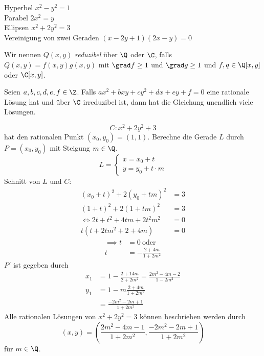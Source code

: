 \begin{exmp*}
	Hyperbel $x^2-y^2 = 1$\\
	Parabel $2x^2=y$\\
	Ellipsen $x^2+2y^2=3$\\
	Vereinigung von zwei Geraden $(x-2y+1)(2x-y)=0$
\end{exmp*}

Wir nennen $Q(x,y)$ \emph{reduzibel} über $\Q$ oder $\C$, falls $Q(x,y) = f(x,y)g(x,y)$ mit $\grad f \geq1$ und $\grad g \geq 1$ und $f,q \in \Q[x,y]$ oder $\C[x,y]$.

\begin{thm}\autolabel
	Seien $a,b,c,d,e,f \in \Z$. Falls $ ax^2+bxy+cy^2+dx+ey+f = 0$ eine rationale Lösung hat und über $\C$ irreduzibel ist, dann hat die Gleichung unendlich viele Lösungen.
\end{thm}

\begin{exmp*}
	\[ C: x^2+2y^2+3 \]
	hat den rationalen Punkt $(x_0,y_0) = (1,1)$. Berechne die Gerade $L$ durch $P = (x_0,y_0)$ mit Steigung $m \in \Q$.
	\[ L = \begin{cases}
		x = x_0 + t\\
		y = y_0 + t \cdot m
	\end{cases} \]
	Schnitt von $L$ und $C$:
	\begin{align*}
		(x_0+t)^2 + 2(y_0+tm)^2 &= 3\\
		(1+t)^2 + 2(1+tm)^2 &= 3\\
		\iff 2t + t^2 + 4tm + 2t^2m^2 &= 0\\
		t(t+2tm^2 + 2 + 4m) &= 0
	\end{align*}
	\begin{align*}
		\implies t &= 0 \ \text{oder}\\
		t &= -\frac{2+4m}{1+2m^2}
	\end{align*}
	$P'$ ist gegeben durch
	\begin{align*}
		x_1 &= 1- \frac{2+14m}{2+2m^2} = \frac{2m^2 - 4m - 2}{1-2m^2}\\
		y_1 &= 1-m \frac{2+4m}{1+2m^2}\\
		&= \frac{-2m^2 - 2m+1}{1+2m^2}
	\end{align*}
	Alle rationalen Lösungen von $x^2+2y^2 = 3$ können beschrieben werden durch
	\[ (x,y) = \left( \frac{2m^2-4m-1}{1+2m^2} , \frac{-2m^2 - 2m + 1}{1 + 2m^2} \right) \]
	für $m \in \Q$.
\end{exmp*}